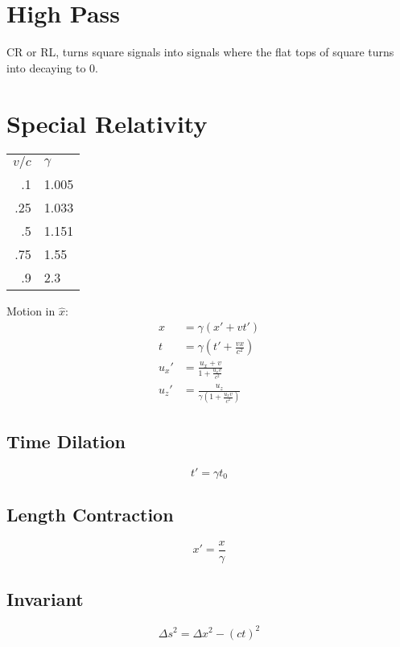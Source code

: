 \documentclass[10pt,a4paper]{article}
\begin{document}
\section{High Pass} %
\label{sec:high_pass}
CR or RL, turns square signals into signals where the flat tops of square turns into decaying to 0.

\section{Special Relativity} %
\label{sec:special_relativity}
\begin{tabular}{ r l}
$v/c$ & $\gamma$\\
.1 & 1.005\\
.25 & 1.033\\
.5 & 1.151\\
.75 & 1.55\\
.9 & 2.3
\end{tabular}
Motion in $\hat{x}$:
\begin{align}
    x &= \gamma (x' + vt')\\
    t &= \gamma \left( t' + \frac{vx}{c^2} \right)\\
    u_x' &= \frac{u_x + v}{1 + \frac{u_x v}{c^2}}\\
    u_z' &= \frac{u_z}{ \gamma \left( 1 + \frac{u_x v}{c^2} \right) }
\end{align}
\subsection{Time Dilation} %
\label{sub:time_dilation}
\begin{equation}
    t' = \gamma t_0
\end{equation}
\subsection{Length Contraction} %
\label{sub:length_contraction}
\begin{equation}
    x' = \frac{x}{\gamma}
\end{equation}
\subsection{Invariant} %
\label{sub:invariant}
\begin{equation}
    \Delta s^2 = \Delta x^2 - (ct)^2
\end{equation}
\end{document}
